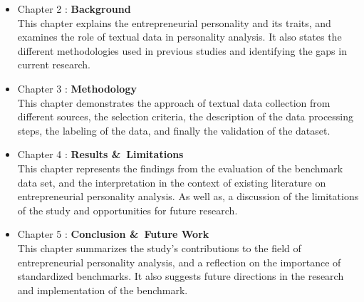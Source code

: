 \begin{itemize}
\item Chapter 2 : \textbf{Background}\\
This chapter explains the entrepreneurial personality and its traits, and examines the role of textual data in personality analysis. It also states the different methodologies used in previous studies and identifying the gaps in current research.

\item Chapter 3 : \textbf{Methodology}\\
This chapter demonstrates the approach of textual data collection from different sources, the selection criteria, the description of the data processing steps, the labeling of the data, and finally the validation of the dataset.

\item Chapter 4 : \textbf{Results \&\ Limitations}\\
This chapter represents the findings from the evaluation of the benchmark data set, and the interpretation in the context of existing literature on entrepreneurial personality analysis. As well as, a discussion of the limitations of the study and opportunities for future research.

\item Chapter 5 : \textbf{Conclusion \&\ Future Work}\\
This chapter summarizes the study's contributions to the field of entrepreneurial personality analysis, and a reflection on the importance of standardized benchmarks. It also suggests future directions in the research and implementation of the benchmark.

\end{itemize}


%
